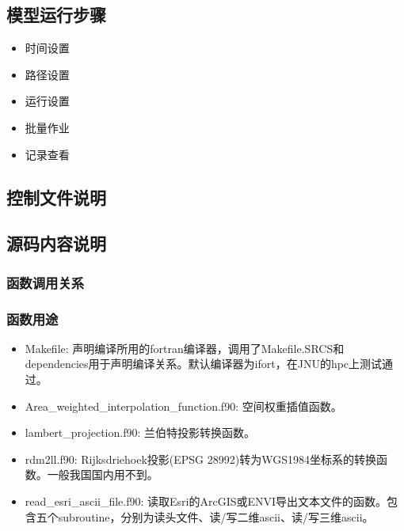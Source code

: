 \documentclass{article}
\begin{document}
\subsection{模型运行步骤}

\begin{itemize}

\item 时间设置

\item 路径设置

\item 运行设置

\item 批量作业

\item 记录查看

\end{itemize}

\subsection{控制文件说明}

\subsection{源码内容说明}

\subsubsection{函数调用关系}

\subsubsection{函数用途}

\begin{itemize}

\item Makefile:
声明编译所用的fortran编译器，调用了Makefile.SRCS和dependencies用于声明编译关系。默认编译器为ifort，在JNU的hpc上测试通过。

\item Area\_weighted\_interpolation\_function.f90:
空间权重插值函数。

\item lambert\_projection.f90:
兰伯特投影转换函数。

\item rdm2ll.f90:
Rijksdriehoek投影(EPSG 28992)转为WGS1984坐标系的转换函数。一般我国国内用不到。

\item read\_esri\_ascii\_file.f90:
读取Esri的ArcGIS或ENVI导出文本文件的函数。包含五个subroutine，分别为读头文件、读/写二维ascii、读/写三维ascii。

\end{itemize}
\end{document}
